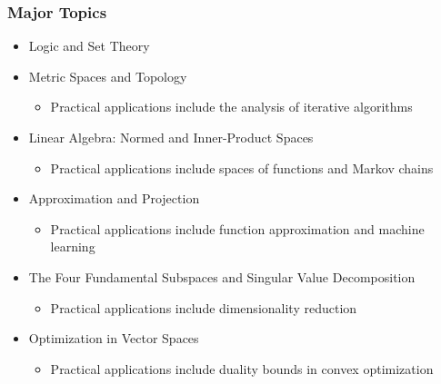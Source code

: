 \documentclass[10pt,english,aspectratio=169]{beamer}
\begin{document}
\begin{frame} \frametitle{Major Topics}

\begin{itemize}
  \setlength\itemsep{4mm}
  \item Logic and Set Theory
  \item Metric Spaces and Topology
  \begin{itemize}
	  \item Practical applications include the analysis of iterative algorithms
  \end{itemize}  
  \item Linear Algebra: Normed and Inner-Product Spaces
  \begin{itemize}
	  \item Practical applications include spaces of functions and Markov chains
  \end{itemize}    
  \item Approximation and Projection
  \begin{itemize}
	  \item Practical applications include function approximation and machine learning
  \end{itemize}     
  \item The Four Fundamental Subspaces and Singular Value Decomposition
  \begin{itemize}
	  \item Practical applications include dimensionality reduction
  \end{itemize} 
  \item Optimization in Vector Spaces
  \begin{itemize}
	  \item Practical applications include duality bounds in convex optimization
  \end{itemize} 
\end{itemize}

	
\end{frame}
\end{document}
